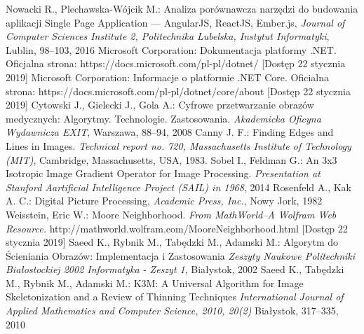 \documentclass[a4paper,11pt,twoside,openright]{report}
\theoremstyle{definition}
\begin{document}
\begin{thebibliography}{20}%
{}

 Nowacki R., Plechawska-Wójcik M.: Analiza porównawcza narzędzi do budowania aplikacji Single Page Application --- AngularJS, ReactJS, Ember.js, \emph{Journal of Computer Sciences Institute 2, Politechnika Lubelska, Instytut Informatyki}, Lublin, 98--103, 2016
 Microsoft Corporation: Dokumentacja platformy .NET. Oficjalna strona: https://docs.microsoft.com/pl-pl/dotnet/ [Dostęp 22 stycznia 2019]
 Microsoft Corporation: Informacje o platformie .NET Core. Oficialna strona: https://docs.microsoft.com/pl-pl/dotnet/core/about [Dostęp 22 stycznia 2019]
 Cytowski J., Gielecki J., Gola A.: Cyfrowe przetwarzanie obrazów medycznych: Algorytmy. Technologie. Zastosowania. \emph{Akademicka Oficyna Wydawnicza EXIT}, Warszawa, 88--94, 2008
 Canny J. F.: Finding Edges and Lines in Images. \emph{Technical report no. 720, Massachusetts Institute of Technology (MIT)}, Cambridge, Massachusetts, USA, 1983.
 Sobel I., Feldman G.: An 3x3 Isotropic Image Gradient Operator for Image Processing. \emph {Presentation at Stanford Aartificial Intelligence Project (SAIL) in 1968}, 2014
 Rosenfeld A., Kak A. C.: Digital Picture Processing, \emph{Academic Press, Inc.}, Nowy Jork, 1982
  Weisstein, Eric W.: Moore Neighborhood. \emph{From MathWorld--A Wolfram Web Resource.} http://mathworld.wolfram.com/MooreNeighborhood.html  [Dostęp 22 stycznia 2019]
 Saeed K., Rybnik M., Tabędzki M., Adamski M.: Algorytm do Ścieniania Obrazów: Implementacja i Zastosowania \emph{Zeszyty Naukowe Politechniki Białostockiej 2002 Informatyka - Zeszyt 1}, Białystok, 2002
 Saeed K., Tabędzki M., Rybnik M., Adamski M.: K3M: A Universal Algorithm for Image Skeletonization and a Review of Thinning Techniques \emph{International Journal of Applied Mathematics and Computer Science, 2010, 20(2)} Białystok, 317--335, 2010

\end{thebibliography}
\end{document}
